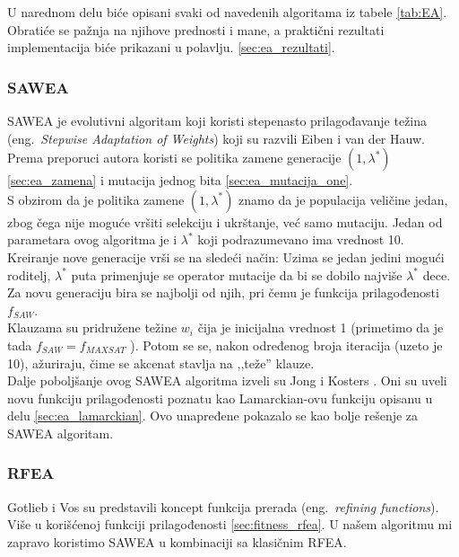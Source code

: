 \documentclass{article}
\begin{document}
U narednom delu biće opisani svaki od navedenih algoritama iz tabele \ref{tab:EA}.
Obratiće se pažnja na njihove prednosti i mane, a praktični rezultati implementacija
biće prikazani u polavlju. \ref{sec:ea_rezultati}.


\subsubsection{SAWEA}
\label{sec:ea_sawea}
SAWEA je evolutivni algoritam koji koristi stepenasto prilagođavanje težina 
(eng.~{\em Stepwise Adaptation of Weights}) \cite{ea_with_table, ea_without_table} 
koji su razvili Eiben i van der Hauw. 
Prema preporuci autora koristi se politika zamene generacije $(1,\lambda^*)$ \ref{sec:ea_zamena} i mutacija jednog bita \ref{sec:ea_mutacija_one}. \\

S obzirom da je politika zamene $(1,\lambda^*)$ znamo da je populacija veličine jedan,
zbog čega nije moguće vršiti selekciju i ukrštanje, već samo mutaciju. 
Jedan od parametara ovog algoritma je i $\lambda^*$ koji podrazumevano ima vrednost 10.
Kreiranje nove generacije vrši se na sledeći način:
Uzima se jedan jedini mogući roditelj, $\lambda^*$ puta primenjuje se operator mutacije
da bi se dobilo najviše $\lambda^*$ dece. Za novu generaciju bira se najbolji od njih,
pri čemu je funkcija prilagođenosti $f_{SAW}$.\\

Klauzama su pridružene težine $w_i$ čija je inicijalna vrednost 1 
(primetimo da je tada $f_{SAW} = f_{MAXSAT}$ ). 
Potom se se, nakon određenog broja iteracija (uzeto je 10),
ažuriraju, čime se akcenat stavlja na ,,teže'' klauze.\\

Dalje poboljšanje ovog SAWEA algoritma izveli su Jong i Kosters \cite{Jong&Kosters}.
Oni su uveli novu funkciju prilagođenosti poznatu kao Lamarckian-ovu funkciju 
opisanu u delu \ref{sec:ea_lamarckian}. Ovo unapređene pokazalo se kao bolje rešenje za
SAWEA algoritam.


\subsubsection{RFEA}
\label{sec:ea_rfea}
Gotlieb i Vos \cite{GotVos98_f_ref, ea_with_table, ea_without_table} su predstavili koncept funkcija prerada (eng.~{\em refining functions}). Više u korišćenoj funkciji prilagođenosti \ref{sec:fitness_rfea}.
U našem algoritmu mi zapravo koristimo SAWEA u kombinaciji sa klasičnim RFEA. \\
\end{document}
